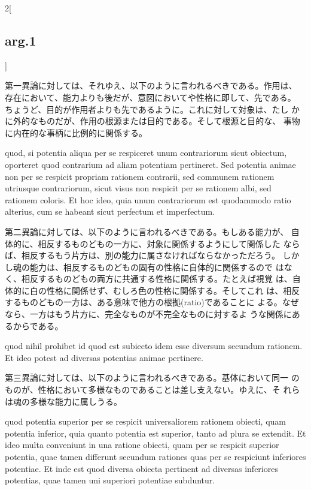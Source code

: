 \documentclass[paper=a4paper,fontsize=10pt,jafontsize=9pt,titlepage]{jlreq}
\begin{document}
\begin{paracol}{2}[\subsection{arg.1}]
 
\switchcolumn

 第一異論に対しては、それゆえ、以下のように言われるべきである。作用は、
 存在において、能力よりも後だが、意図においてや性格に即して、先である。
 ちょうど、目的が作用者よりも先であるように。これに対して対象は、たし
 かに外的なものだが、作用の根源または目的である。そして根源と目的な、
 事物に内在的な事柄に比例的に関係する。

 quod, si potentia aliqua per se
respiceret unum contrariorum sicut obiectum, oporteret quod contrarium
ad aliam potentiam pertineret. Sed potentia animae non per se respicit
propriam rationem contrarii, sed communem rationem utriusque
contrariorum, sicut visus non respicit per se rationem albi, sed
rationem coloris. Et hoc ideo, quia unum contrariorum est quodammodo
ratio alterius, cum se habeant sicut perfectum et imperfectum.
 
 
\switchcolumn

 第二異論に対しては、以下のように言われるべきである。もしある能力が、
 自体的に、相反するものどもの一方に、対象に関係するようにして関係した
 ならば、相反するもう片方は、別の能力に属さなければならなかっただろう。
 しかし魂の能力は、相反するものどもの固有の性格に自体的に関係するので
 はなく、相反するものどもの両方に共通する性格に関係する。たとえば視覚
 は、自体的に白の性格に関係せず、むしろ色の性格に関係する。そしてこれ
 は、相反するものどもの一方は、ある意味で他方の根拠(ratio)であることに
 よる。なぜなら、一方はもう片方に、完全なものが不完全なものに対するよ
 うな関係にあるからである。

 quod nihil prohibet id quod est
 subiecto idem esse diversum secundum rationem. Et ideo potest ad
 diversas potentias animae pertinere.

 
\switchcolumn

 第三異論に対しては、以下のように言われるべきである。基体において同一
 のものが、性格において多様なものであることは差し支えない。ゆえに、そ
 れらは魂の多様な能力に属しうる。


 quod potentia superior per se respicit
 universaliorem rationem obiecti, quam potentia inferior, quia quanto
 potentia est superior, tanto ad plura se extendit. Et ideo multa
 conveniunt in una ratione obiecti, quam per se respicit superior
 potentia, quae tamen differunt secundum rationes quas per se
 respiciunt inferiores potentiae. Et inde est quod diversa obiecta
 pertinent ad diversas inferiores potentias, quae tamen uni superiori
 potentiae subduntur.


\end{paracol}
\end{document}
